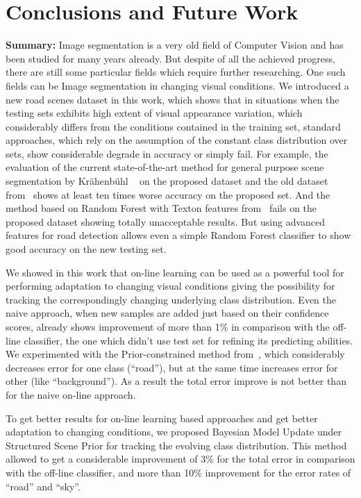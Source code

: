 \chapter{Conclusions and Future Work}
\label{Chapter6}

{\bf Summary:} \quad Image segmentation is a very old field of Computer Vision and has been studied for many years already. But despite of all the 
achieved progress, there are still some particular fields which require further researching. One such fields can be Image segmentation in changing
visual conditions. We introduced a new road scenes dataset in this work, which shows that in situations when the testing sets exhibits high
extent of visual appearance variation, which considerably differs from the conditions contained in the training set, standard approaches, which
rely on the assumption of the constant class distribution over sets, show considerable degrade in accuracy or simply fail. For example, the evaluation
of the current state-of-the-art method for general purpose scene segmentation by Kr\"ahenb\"uhl \etal~\cite{Krahenbuhl2011} on the proposed dataset and 
the old dataset from~\cite{Wojek2008} shows at least ten times worse accuracy on the proposed set. And the method based on Random Forest with Texton 
features from~\cite{Shotton2009} fails on the proposed dataset showing totally unacceptable results. But using advanced features for road detection allows 
even a simple Random Forest classifier to show good accuracy on the new testing set.

We showed in this work that on-line learning can be used as a powerful tool for performing adaptation to changing visual conditions giving 
the possibility for tracking the correspondingly changing underlying class distribution. Even the naive approach, when new samples are added
just based on their confidence scores, already shows improvement of more than 1\% in comparison with the off-line classifier, the one which didn't
use test set for refining its predicting abilities. We experimented with the Prior-constrained method from~\cite{Alvarez2012}, which considerably
decreases error for one class (``road''), but at the same time increases error for other (like ``background''). As a result the total error improve 
is not better than for the naive on-line approach.

To get better results for on-line learning based approaches and get better adaptation to changing conditions, we proposed Bayesian Model Update
under Structured Scene Prior for tracking the evolving class distribution. This method allowed to get a considerable improvement of 3\% for the 
total error in comparison with the off-line classifier, and more than 10\% improvement for the error rates of ``road'' and ``sky''.

